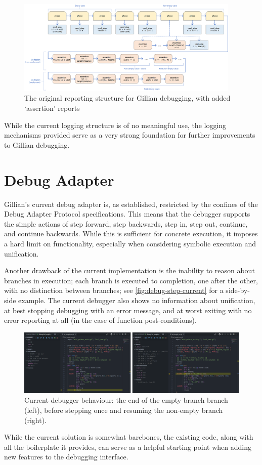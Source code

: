 \begin{figure}
  \center{}
  \includegraphics[width=0.95\textwidth]{img/log-structure-current.png}
  \caption{The original reporting structure for Gillian debugging, with added 
    `assertion' reports}\label{fig:log-structure-current}
\end{figure}

While the current logging structure is of no meaningful use, the logging
mechanisms provided serve as a very strong foundation for further improvements
to Gillian debugging.


\section{Debug Adapter}\label{sec:current:dap}

Gillian's current debug adapter is, as established, restricted by the confines
of the Debug Adapter Protocol specifications. This means that the debugger
supports the simple actions of step forward, step backwards, step in, step out,
continue, and continue backwards. While this is sufficient for concrete
execution, it imposes a hard limit on functionality, especially when considering
symbolic execution and unification.

Another drawback of the current implementation is the inability to reason
about branches in execution; each branch is executed to completion, one after
the other, with no distinction between branches; see
\autoref{fig:debug-step-current} for a side-by-side example. The current
debugger also shows no information about unification, at best stopping debugging
with an error message, and at worst exiting with no error reporting at all (in
the case of function post-conditions).

\begin{figure}
  \center{}
  \includegraphics[width=\textwidth]{img/debug-step-current.png}
  \caption{
    Current debugger behaviour: the end of the empty branch branch (left),
    before stepping once and resuming the non-empty branch (right).}%
  \label{fig:debug-step-current}
\end{figure}

While the current solution is somewhat barebones, the existing code, along with
all the boilerplate it provides, can serve as a helpful starting point when
adding new features to the debugging interface.
